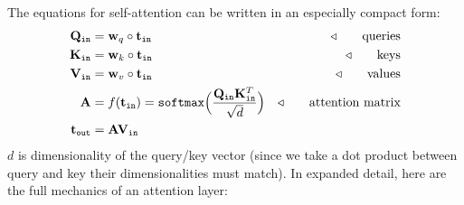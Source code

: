 
The equations for self-attention can be written in an especially compact form:
\begin{align}
    \mathbf{Q}_{\texttt{in}} &= \mathbf{w}_{q} \circ \mathbf{t}_{\texttt{in}} &\triangleleft \quad\quad \text{queries}\\
    \mathbf{K}_{\texttt{in}} &= \mathbf{w}_{k} \circ \mathbf{t}_{\texttt{in}} &\triangleleft \quad\quad \text{keys}\\
    \mathbf{V}_{\texttt{in}} &= \mathbf{w}_{v} \circ \mathbf{t}_{\texttt{in}} &\triangleleft \quad\quad \text{values}\\
    \mathbf{A} &= f(\mathbf{t}_{\texttt{in}}) = \texttt{softmax}\Big(\frac{\mathbf{Q}_{\texttt{in}}\mathbf{K}_{\texttt{in}}^T}{\sqrt{d}}\Big) &\triangleleft \quad\quad \text{attention matrix}\\
    \mathbf{t}_{\texttt{out}} &= \mathbf{A}\mathbf{V}_{\texttt{in}}
\end{align}
$d$ is dimensionality of the query/key vector (since we take a dot product between query and key their dimensionalities must match). In expanded detail, here are the full mechanics of an attention layer:
